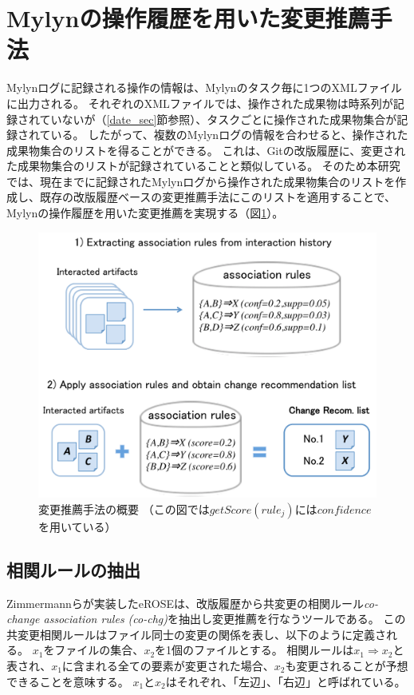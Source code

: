 \documentclass[a4paper]{jsbook}
\def\Ra{\Rightarrow}
\newcommand{\confidence}{con\!f\!idence}
\newcommand{\getScore}{getS\!core}
\begin{document}
\section{Mylynの操作履歴を用いた変更推薦手法}\label{method_sec}
Mylynログに記録される操作の情報は、Mylynのタスク毎に1つのXMLファイルに出力される。
それぞれのXMLファイルでは、操作された成果物は時系列が記録されていないが（\ref{date_sec}節参照）、タスクごとに操作された成果物集合が記録されている。
したがって、複数のMylynログの情報を合わせると、操作された成果物集合のリストを得ることができる。
これは、Gitの改版履歴に、変更された成果物集合のリストが記録されていることと類似している。
そのため本研究では、現在までに記録されたMylynログから操作された成果物集合のリストを作成し、既存の改版履歴ベースの変更推薦手法にこのリストを適用することで、Mylynの操作履歴を用いた変更推薦を実現する（図\ref{proposal}）。

\begin{figure}[tb]
  \centering
  \includegraphics[width = \linewidth]{resource/proposal.pdf}
  \caption{変更推薦手法の概要 （この図では$\getScore(rule_j)$には$\confidence$を用いている）}
  \label{proposal}
\end{figure}

\subsection{相関ルールの抽出}\label{extractrules_sec}
Zimmermannらが実装したeROSE\cite{Zimmermann:2005}は、改版履歴から共変更の相関ルール{\it co-change association rules (co-chg)}を抽出し変更推薦を行なうツールである。
この共変更相関ルールはファイル同士の変更の関係を表し、以下のように定義される。
$x_1$をファイルの集合、$x_2$を1個のファイルとする。
相関ルールは$x_1 \Ra x_2$と表され、$x_1$に含まれる全ての要素が変更された場合、$x_2$も変更されることが予想できることを意味する。
$x_1$と$x_2$はそれぞれ、「左辺」、「右辺」と呼ばれている。
\end{document}
